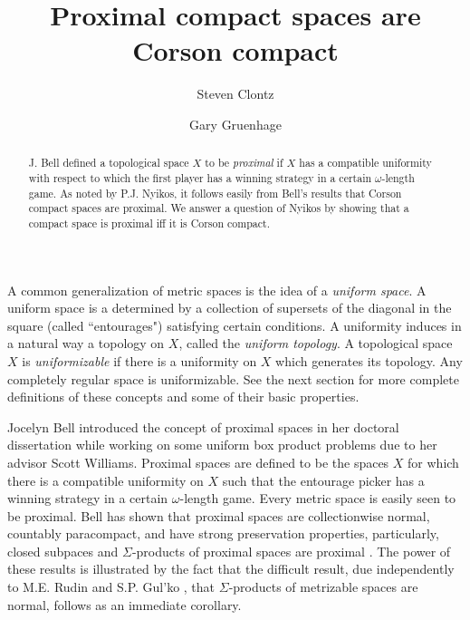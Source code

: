 \documentclass{amsart}
\theoremstyle{definition}
\theoremstyle{remark}
\newcommand{\<}{\langle}
\renewcommand{\>}{\rangle}
\newcommand{\term}{\textit}
\begin{document}
\title{Proximal compact spaces are Corson compact}



\author{Steven Clontz}
\address{Department of Mathematics, Auburn University,
Auburn, AL 36830}

\author{Gary Gruenhage}
\address{Department of Mathematics, Auburn University,
Auburn, AL 36830}




\begin{abstract}

J. Bell defined a topological space $X$ to be \term{proximal} if $X$ has a compatible uniformity with respect to which the first player has a winning strategy in a certain $\omega$-length game.  As noted by P.J. Nyikos, it follows easily from Bell's results that Corson compact spaces are proximal.  We answer a question of Nyikos by showing that a compact space is proximal iff it is Corson compact.
\end{abstract}


\maketitle

A common generalization of metric spaces is the idea of a \term{uniform space}.  A uniform space is a determined by a collection of supersets of the diagonal in the square (called ``entourages")  satisfying certain conditions.  A uniformity induces in a natural way a topology on $X$, called the \term{uniform topology}.  A topological space $X$ is \term{uniformizable} if there is  a uniformity on $X$ which generates its topology.   Any completely regular space is uniformizable.  See the next section for more complete definitions of these concepts and some of their basic properties.

Jocelyn Bell introduced the concept of proximal spaces in her doctoral dissertation while working on some uniform box product problems due to her advisor Scott Williams.  Proximal spaces are defined to be the spaces $X$ for which there is a compatible uniformity on $X$ such that the entourage picker has a winning strategy in a certain $\omega$-length game. Every metric space is easily seen to be proximal. Bell has shown that proximal spaces are collectionwise normal, countably paracompact, and have strong preservation properties, particularly, closed subpaces and  $\Sigma$-products of proximal spaces are  proximal \cite{b}.  The power of these results is illustrated by the fact that the difficult result, due independently to M.E. Rudin \cite{ru} and S.P. Gul'ko \cite{gu}, that $\Sigma$-products of metrizable spaces are normal, follows as an immediate corollary.
\end{document}
